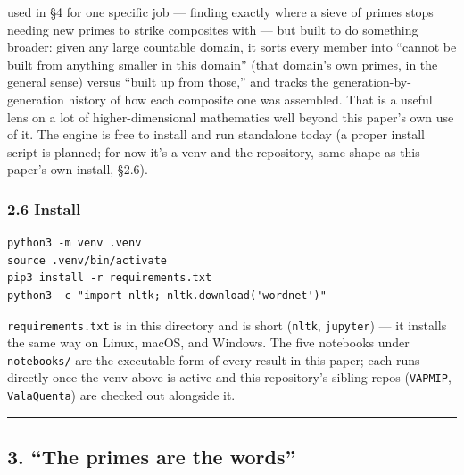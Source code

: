 \documentclass[
  10pt,
]{article}
\begin{document}
\begin{itemize}
  used in §4 for one specific job --- finding exactly where a sieve of
  primes stops needing new primes to strike composites with --- but
  built to do something broader: given any large countable domain, it
  sorts every member into ``cannot be built from anything smaller in
  this domain'' (that domain's own primes, in the general sense) versus
  ``built up from those,'' and tracks the generation-by-generation
  history of how each composite one was assembled. That is a useful lens
  on a lot of higher-dimensional mathematics well beyond this paper's
  own use of it. The engine is free to install and run standalone today
  (a proper install script is planned; for now it's a venv and the
  repository, same shape as this paper's own install, §2.6).
\end{itemize}

\hypertarget{install}{%
\subsubsection{2.6 Install}\label{install}}

\begin{verbatim}
python3 -m venv .venv
source .venv/bin/activate
pip3 install -r requirements.txt
python3 -c "import nltk; nltk.download('wordnet')"
\end{verbatim}

\texttt{requirements.txt} is in this directory and is short
(\texttt{nltk}, \texttt{jupyter}) --- it installs the same way on Linux,
macOS, and Windows. The five notebooks under \texttt{notebooks/} are the
executable form of every result in this paper; each runs directly once
the venv above is active and this repository's sibling repos
(\texttt{VAPMIP}, \texttt{ValaQuenta}) are checked out alongside it.

\begin{center}\rule{0.5\linewidth}{0.5pt}\end{center}

\hypertarget{the-primes-are-the-words}{%
\subsection{3. ``The primes are the
words''}\label{the-primes-are-the-words}}
\end{document}

